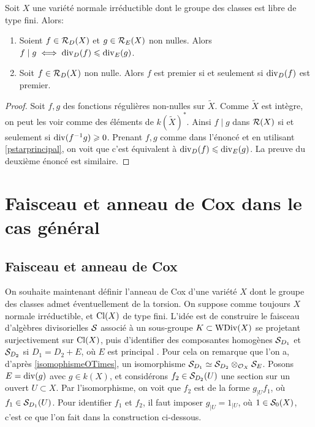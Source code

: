 \begin{prop}\label{divisibilitePropsFreeCox}
Soit $X$ une variété normale irréductible dont le groupe des classes est libre de type fini.  Alors:
\begin{enumerate}
\item Soient $f\in \mathcal{R}_D(X)$ et $g\in \mathcal{R}_E(X)$ non nulles. Alors $f\mid g\iff \operatorname{div}_D(f)\leqslant\operatorname{div}_E(g)$.
\item Soit $f\in \mathcal{R}_D(X)$ non nulle. Alors $f$ est premier si et seulement si $\operatorname{div}_D(f)$ est premier.
\end{enumerate}
\end{prop}
\begin{proof}
Soit $f,g$ des fonctions régulières non-nulles sur $\widetilde{X}$. Comme $\widetilde{X}$ est intègre, on peut les voir comme des éléments de $k(\widetilde{X})^*$. Ainsi $f\mid g$ dans $\mathcal{R}(X)$ si et seulement si $\operatorname{div}(f^{-1}g)\geqslant 0$. Prenant $f,g$ comme dans l'énoncé et en utilisant \ref{pstarprincipal}, on voit que c'est équivalent à $\operatorname{div}_D(f)\leqslant\operatorname{div}_E(g)$. La preuve du deuxième énoncé est similaire.
\end{proof}

\section{Faisceau et anneau de Cox dans le cas général}

\subsection{Faisceau et anneau de Cox}

On souhaite maintenant définir l'anneau de Cox d'une variété $X$ dont le groupe des classes admet éventuellement de la torsion. On suppose comme toujours $X$ normale irréductible, et $\operatorname{Cl}(X)$ de type fini. L'idée est de construire le faisceau d'algèbres divisorielles $\mathcal{S}$ associé à un sous-groupe $K\subset \operatorname{WDiv}(X)$ se projetant surjectivement sur $\operatorname{Cl}(X)$, puis d'identifier des composantes homogènes $\mathcal{S}_{D_1}$ et  $\mathcal{S}_{D_2}$ si $D_1=D_2+E$, où $E$ est principal . Pour cela on remarque que l'on a, d'après \ref{isomophismeOTimes}, un isomorphisme $\mathcal{S}_{D_1}\simeq \mathcal{S}_{D_2}\otimes_{\mathcal{O}_X}\mathcal{S}_E$. Posons $E=\operatorname{div}(g)$ avec $g\in k(X)$, et considérons $f_2\in \mathcal{S}_{D_2}(U)$ une section sur un ouvert $U\subset X$. Par l'isomorphisme, on voit que $f_2$ est de la forme $g_{|U}f_1$, où $f_1\in \mathcal{S}_{D_1}(U)$. Pour identifier $f_1$ et $f_2$, il faut imposer $g_{|U}=1_{|U}$, où $1\in\mathcal{S}_0(X)$, c'est ce que l'on fait dans la construction ci-dessous.

